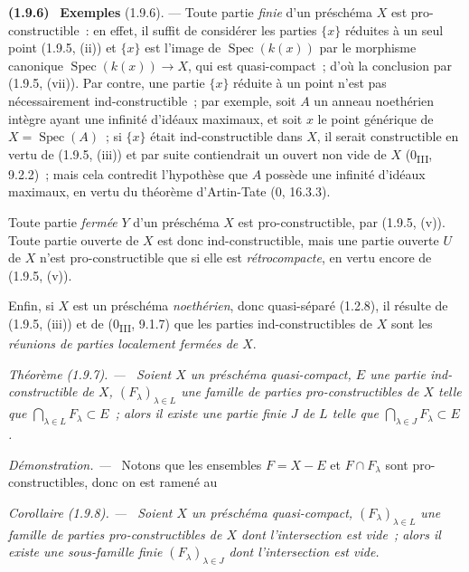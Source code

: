 \documentclass[10pt,oneside]{book}
\makeatletter
\newcommand{\setmanualcurrentlabel}[1]{\def\@currentlabel{#1}}
\newenvironment{env}[1][]{\setmanualcurrentlabel{#1}\par\medskip\noindent\textbf{(#1)}\ }{\par}
\newenvironment{theorem}[1][]{%
  \setmanualcurrentlabel{#1}\par\medskip\noindent\itshape Théorème (#1). ---\ }{\par}
\newenvironment{corollary}[1][]{%
  \setmanualcurrentlabel{#1}\par\medskip\noindent\itshape Corollaire (#1). ---\ }{\par}
\newenvironment{proof}{%
  \par\medskip\noindent\textit{Démonstration. ---\ }}{\par}
\makeatother
\begin{document}
\begin{env}[1.9.6]
\label{IV.1.9.6-fr}
\textbf{Exemples} (1.9.6). --- Toute partie \emph{finie} d'un préschéma $X$
est pro-constructible~: en effet, il suffit de considérer les parties
$\{x\}$ réduites à un seul point (1.9.5, (ii)) et $\{x\}$ est l'image de
$\operatorname{Spec}(k(x))$ par le morphisme canonique
$\operatorname{Spec}(k(x))\to X$, qui est quasi-compact~; d'où la conclusion
par (1.9.5, (vii)). Par contre, une partie $\{x\}$ réduite à un point n'est
pas nécessairement ind-constructible~; par exemple, soit $A$ un anneau
noethérien intègre ayant une infinité d'idéaux maximaux, et soit $x$ le point
générique de $X=\operatorname{Spec}(A)$~; si $\{x\}$ était ind-constructible
dans $X$, il serait constructible en vertu de (1.9.5, (iii)) et par suite
contiendrait un ouvert non vide de $X$ (0\textsubscript{III}, 9.2.2)~; mais
cela contredit l'hypothèse que $A$ possède une infinité d'idéaux maximaux, en
vertu du théorème d'Artin-Tate (0, 16.3.3).

Toute partie \emph{fermée} $Y$ d'un préschéma $X$ est pro-constructible, par
(1.9.5, (v)). Toute partie ouverte de $X$ est donc ind-constructible, mais
une partie ouverte $U$ de $X$ n'est pro-constructible que si elle est
\emph{rétrocompacte}, en vertu encore de (1.9.5, (v)).

Enfin, si $X$ est un préschéma \emph{noethérien}, donc quasi-séparé (1.2.8),
il résulte de (1.9.5, (iii)) et de (0\textsubscript{III}, 9.1.7) que les
parties ind-constructibles de $X$ sont les \emph{réunions de parties
localement fermées de $X$}.
\end{env}

\begin{theorem}[1.9.7]
\label{IV.1.9.7-fr}
Soient $X$ un préschéma quasi-compact, $E$ une partie ind-constructible de
$X$, $(F_\lambda)_{\lambda\in L}$ une famille de parties pro-constructibles
de $X$ telle que $\bigcap_{\lambda\in L}F_\lambda\subset E$~; alors il existe
une partie finie $J$ de $L$ telle que
$\bigcap_{\lambda\in J}F_\lambda\subset E$.
\end{theorem}

\begin{proof}
Notons que les ensembles $F=X-E$ et $F\cap F_\lambda$ sont
pro-constructibles, donc on est ramené au
\end{proof}

\begin{corollary}[1.9.8]
\label{IV.1.9.8-fr}
Soient $X$ un préschéma quasi-compact, $(F_\lambda)_{\lambda\in L}$ une
famille de parties pro-constructibles de $X$ dont l'intersection est vide~;
alors il existe une sous-famille finie $(F_\lambda)_{\lambda\in J}$ dont
l'intersection est vide.
\end{corollary}
\end{document}
